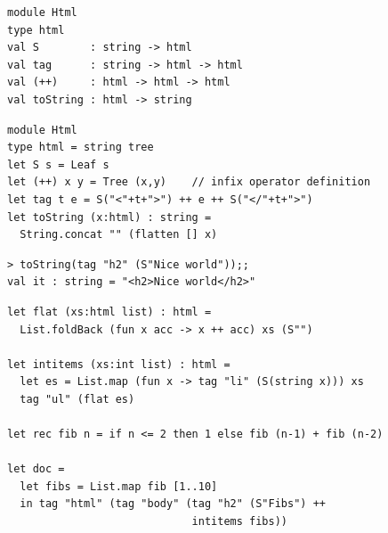 \documentclass[rgb]{beamer}
\begin{document}
\begin{frame}[fragile]
\begin{footnotesize}

  \vspace{1ex}
\begin{lstlisting}[numbers=none,frame=none,mathescape]
module Html
type html
val S        : string -> html
val tag      : string -> html -> html
val (++)     : html -> html -> html
val toString : html -> string
\end{lstlisting}

  \vspace{1ex}
\begin{lstlisting}[numbers=none,frame=none,mathescape]
module Html
type html = string tree
let S s = Leaf s
let (++) x y = Tree (x,y)    // infix operator definition
let tag t e = S("<"+t+">") ++ e ++ S("</"+t+">")
let toString (x:html) : string =
  String.concat "" (flatten [] x)
\end{lstlisting}

\end{footnotesize}
\end{frame}

\begin{frame}[fragile]
\begin{footnotesize}


  \vspace{1ex}
\begin{lstlisting}[numbers=none,frame=none,mathescape]
> toString(tag "h2" (S"Nice world"));;
val it : string = "<h2>Nice world</h2>"
\end{lstlisting}

  \vspace{1ex}

  \vspace{1ex}

\begin{lstlisting}[numbers=none,frame=none,mathescape]
let flat (xs:html list) : html =
  List.foldBack (fun x acc -> x ++ acc) xs (S"")

let intitems (xs:int list) : html =
  let es = List.map (fun x -> tag "li" (S(string x))) xs
  tag "ul" (flat es)

let rec fib n = if n <= 2 then 1 else fib (n-1) + fib (n-2)

let doc =
  let fibs = List.map fib [1..10]
  in tag "html" (tag "body" (tag "h2" (S"Fibs") ++
                             intitems fibs))
\end{lstlisting}

\end{footnotesize}
\end{frame}
\end{document}
